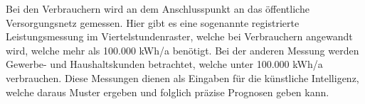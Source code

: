 Bei den Verbrauchern wird an dem Anschlusspunkt an das öffentliche
Versorgungsnetz gemessen. Hier gibt es eine sogenannte registrierte
Leistungsmessung im Viertelstundenraster, welche bei Verbrauchern angewandt
wird, welche mehr als 100.000 kWh/a benötigt. Bei der anderen Messung werden
Gewerbe- und Haushaltskunden betrachtet, welche unter 100.000 kWh/a
verbrauchen.\cite{deppekunstliche} Diese Messungen dienen als Eingaben für die
künstliche Intelligenz, welche daraus Muster ergeben und folglich präzise
Prognosen geben kann.